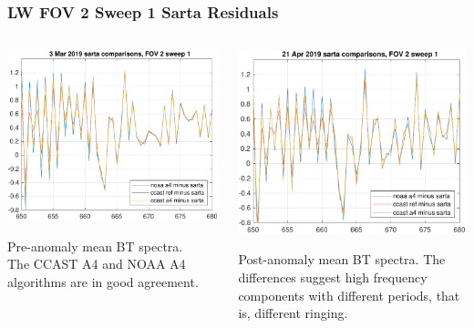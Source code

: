 \documentclass[10pt]{beamer}
\begin{document}
\begin{frame}
\frametitle{LW FOV 2 Sweep 1 Sarta Residuals}
\begin{columns}[t]
\begin{column}{0.5\textwidth}
  \begin{centering}
  \includegraphics[width=\textwidth]{figures/LW_pre_fail_sarta_fov2_sd1.pdf}
  \end{centering}\vspace{3mm}
  Pre-anomaly mean BT spectra.  \\The CCAST A4 and NOAA A4 algorithms
  are in good agreement.

\end{column}
\begin{column}{0.5\textwidth}  
  \begin{centering}
  \includegraphics[width=\textwidth]{figures/LW_post_fail_sarta_fov2_sd1.pdf}
  \end{centering}\vspace{3mm}
  Post-anomaly mean BT spectra. The differences suggest high
  frequency components with different periods, that is, different
  ringing.

\end{column}
\end{columns}
\end{frame}
\end{document}

